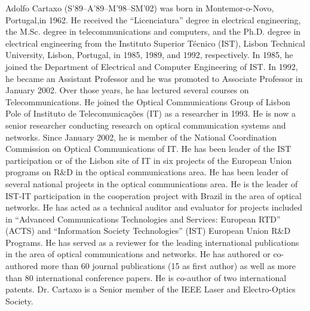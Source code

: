 \documentclass[journal]{IEEEtran}
\begin{document}
\begin{IEEEbiographynophoto}{Adolfo Cartaxo}
(S’89–A’89–M’98–SM’02) was born in Montemor-o-Novo, Portugal,in 1962. He received the ``Licenciatura'' degree in electrical engineering, the M.Sc. degree in telecommunications and computers, and the Ph.D. degree in electrical engineering from the Instituto Superior Técnico (IST), Lisbon Technical University, Lisbon, Portugal, in 1985, 1989, and 1992, respectively. In 1985, he joined the Department of Electrical and Computer Engineering of IST. In 1992, he became an Assistant Professor and he was promoted to Associate Professor in January 2002. Over those years, he has lectured several courses on Telecommunications. He joined the Optical Communications Group of Lisbon Pole of Instituto de Telecomunicações (IT) as a researcher in 1993. He is now a senior researcher conducting research on optical communication systems and networks. Since January 2002, he is member of the National Coordination Commission on Optical Communications of IT. He has been leader of the IST participation or of the Lisbon site of IT in six projects of the European Union programs on R$\&$D in the optical communications area. He has been leader of several national projects in the optical communications area. He is the leader of IST-IT participation in the cooperation project with Brazil in the area of optical networks. He has acted as a technical auditor and evaluator for projects included in ``Advanced Communications Technologies and Services: European RTD'' (ACTS) and ``Information Society Technologies'' (IST) European Union R$\&$D Programs. He has served as a reviewer for the leading international publications in the area of optical communications and networks. He has authored or co-authored more than 60 journal publications (15 as first author) as well as more than 80 international conference papers. He is co-author of two international patents.
Dr. Cartaxo is a Senior member of the IEEE Laser and Electro-Optics Society. 

\end{IEEEbiographynophoto}
\end{document}
